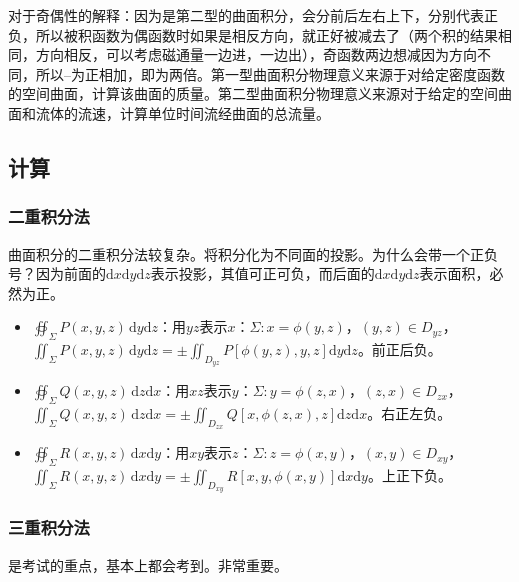 \documentclass[UTF8, 12pt]{ctexart}
\begin{document}
        对于奇偶性的解释：因为是第二型的曲面积分，会分前后左右上下，分别代表正负，所以被积函数为偶函数时如果是相反方向，就正好被减去了（两个积的结果相同，方向相反，可以考虑磁通量一边进，一边出），奇函数两边想减因为方向不同，所以--为正相加，即为两倍。第一型曲面积分物理意义来源于对给定密度函数的空间曲面，计算该曲面的质量。第二型曲面积分物理意义来源对于给定的空间曲面和流体的流速，计算单位时间流经曲面的总流量。

        \subsection{计算}

        \subsubsection{二重积分法}

        曲面积分的二重积分法较复杂。将积分化为不同面的投影。为什么会带一个正负号？因为前面的$\textrm{d}x\textrm{d}y\textrm{d}z$表示投影，其值可正可负，而后面的$\textrm{d}x\textrm{d}y\textrm{d}z$表示面积，必然为正。

        \begin{itemize}
            \item $\oiint_\Sigma P(x,y,z)\,\textrm{d}y\textrm{d}z$：用$yz$表示$x$：$\Sigma:x=\phi(y,z)$，$(y,z)\in D_{yz}$，\\$\iint_\Sigma P(x,y,z)\,\textrm{d}y\textrm{d}z=\pm\iint_{D_{yz}}P[\phi(y,z),y,z]\textrm{d}y\textrm{d}z$。前正后负。
            \item $\oiint_\Sigma Q(x,y,z)\,\textrm{d}z\textrm{d}x$：用$xz$表示$y$：$\Sigma:y=\phi(z,x)$，$(z,x)\in D_{zx}$，\\$\iint_\Sigma Q(x,y,z)\,\textrm{d}z\textrm{d}x=\pm\iint_{D_{zx}}Q[x,\phi(z,x),z]\textrm{d}z\textrm{d}x$。右正左负。
            \item $\oiint_\Sigma R(x,y,z)\,\textrm{d}x\textrm{d}y$：用$xy$表示$z$：$\Sigma:z=\phi(x,y)$，$(x,y)\in D_{xy}$，\\$\iint_\Sigma R(x,y,z)\,\textrm{d}x\textrm{d}y=\pm\iint_{D_{xy}}R[x,y,\phi(x,y)]\textrm{d}x\textrm{d}y$。上正下负。
        \end{itemize}

        \subsubsection{三重积分法}

        是考试的重点，基本上都会考到。非常重要。
\end{document}
